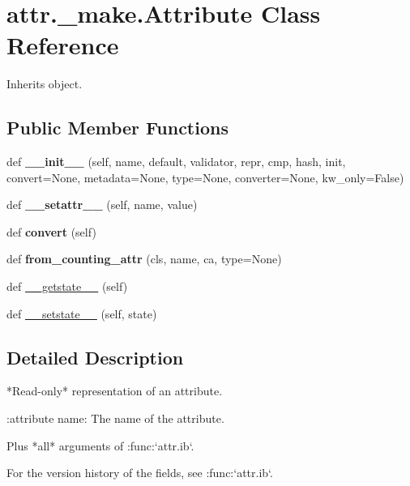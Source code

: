 \hypertarget{classattr_1_1__make_1_1_attribute}{}\section{attr.\+\_\+make.\+Attribute Class Reference}
\label{classattr_1_1__make_1_1_attribute}


Inherits object.

\subsection*{Public Member Functions}
\begin{DoxyCompactItemize}
\item 
\mbox{\label{classattr_1_1__make_1_1_attribute_ae9a7838b69900bb5a9bbf9dbc6bde415}} 
def {\bfseries \+\_\+\+\_\+init\+\_\+\+\_\+} (self, name, default, validator, repr, cmp, hash, init, convert=None, metadata=None, type=None, converter=None, kw\+\_\+only=False)
\item 
\mbox{\label{classattr_1_1__make_1_1_attribute_a75126bfcc5598ce0ea2eb0ab749e1637}} 
def {\bfseries \+\_\+\+\_\+setattr\+\_\+\+\_\+} (self, name, value)
\item 
\mbox{\label{classattr_1_1__make_1_1_attribute_ad3dd0924d334831f8472fe30c6cebd46}} 
def {\bfseries convert} (self)
\item 
\mbox{\label{classattr_1_1__make_1_1_attribute_a525513ef9e26f10ae56c2d37e4da8ac9}} 
def {\bfseries from\+\_\+counting\+\_\+attr} (cls, name, ca, type=None)
\item 
def \hyperlink{classattr_1_1__make_1_1_attribute_a615f79f2a794da987c3a60bd8e87ca20}{\+\_\+\+\_\+getstate\+\_\+\+\_\+} (self)
\item 
def \hyperlink{classattr_1_1__make_1_1_attribute_a699d6f5fd489310cd1cfe320a79bb32d}{\+\_\+\+\_\+setstate\+\_\+\+\_\+} (self, state)
\end{DoxyCompactItemize}


\subsection{Detailed Description}
\begin{DoxyVerb}*Read-only* representation of an attribute.

:attribute name: The name of the attribute.

Plus *all* arguments of :func:`attr.ib`.

For the version history of the fields, see :func:`attr.ib`.
\end{DoxyVerb}
 


